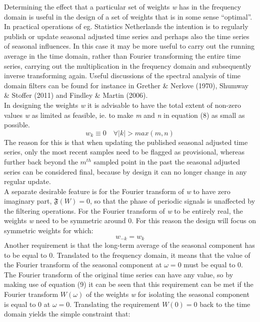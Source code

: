 \documentclass{article}
\begin{document}
Determining the effect that a particular set of weights \textit{w} has in the frequency domain is useful in the design of a set of weights that is in some sense ``optimal''. In practical operations of eg. Statistics Netherlands the intention is to regularly publish or update seasonal adjusted time series and perhaps also the time series of seasonal influences. In this case it may be more useful to carry out the running average in the time domain, rather than Fourier transforming the entire time series, carrying out the multiplication in the frequency domain and subsequently inverse transforming again. Useful discussions of the spectral analysis of time domain filters can be found for instance in Grether \& Nerlove (1970), Shumway \& Stoffer (2011) and Findley \& Martin (2006).\\In designing the weights \textit{w} it is advisable  to have the total extent of non-zero values \textit{w} as limited as feasible, ie. to make \textit{m} and \textit{n} in equation (8) as small as possible.
\begin{equation}
w_k \equiv 0 \quad \forall |k| > max(m,n)
\end{equation}
The reason for this is that when updating the published seasonal adjusted time series, only the most recent samples need to be flagged as provisional, whereas further back beyond the $m^{th}$ sampled point in the past the seasonal adjusted series can be considered final, because by design it can no longer change in any regular update.\\A separate desirable feature is for the Fourier transform of \textit{w} to have zero imaginary part, $\mathfrak{F}(W) = 0$, so that the phase of periodic signals is unaffected by the filtering operations. For the Fourier transform of \textit{w} to be entirely real, the weights \textit{w} need to be symmetric around 0. For this reason the design will focus on symmetric weights for which:
\begin{equation}
w_{-k} = w_k
\end{equation}
Another requirement is that the long-term average of the seasonal component has to be equal to 0. Translated to the frequency domain, it means that the value of the Fourier transform of the seasonal component at $\omega=0$ must be equal to 0. The Fourier transform of the original time series can have any value, so by making use of equation (9) it can be seen that this requirement can be met if the Fourier transform $W(\omega)$ of the weights \textit{w} for isolating the seasonal component is equal to 0 at $\omega=0$.  Translating the requirement $W(0)=0$ back to the time domain yields the simple constraint that:
\end{document}
